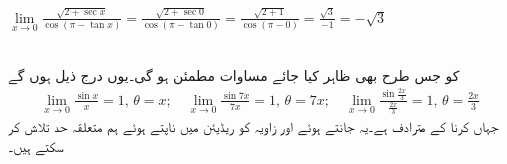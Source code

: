 $\lim\limits_{x\to 0} \frac{\sqrt{2+\sec x}}{\cos(\pi-\tan x)}=\frac{\sqrt{2+\sec 0}}{\cos(\pi-\tan 0)}=\frac{\sqrt{2+1}}{\cos(\pi-0)}=\frac{\sqrt{3}}{-1}=-\sqrt{3}$

\\
 کو جس طرح بھی ظاہر کیا جائے مساوات  مطمئن ہو گی۔یوں درج ذیل ہوں گے
\begin{align*}
\lim_{x\to 0}\frac{\sin x}{x}=1,\, \theta=x;\quad  \lim_{x\to 0}\frac{\sin 7x}{7x}=1,\, \theta=7x; \quad \lim_{x\to0} \frac{\sin \tfrac{2x}{3}}{\tfrac{2x}{3}}=1,\,\theta=\tfrac{2x}{3}
\end{align*}
جہاں  کرنا  کے مترادف ہے۔یہ جانتے ہوئے اور زاویہ کو ریڈیئن میں ناپتے ہوئے ہم متعلقہ حد تلاش کر سکتے ہیں۔


